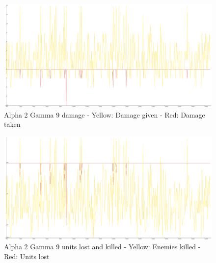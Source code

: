 \begin{figure}
\includegraphics[angle=-90, scale=0.25]{Figures/learningrate/A2G9/damage.png}
\caption{Alpha 2 Gamma 9 damage - Yellow: Damage given - Red: Damage taken}
\label{fig:a2g9_damage}
\end{figure}	

\begin{figure}
\includegraphics[angle=-90, scale=0.25]{Figures/learningrate/A2G9/units_lost_and_units_killed.png}
\caption{Alpha 2 Gamma 9 units lost and killed - Yellow: Enemies killed - Red: Units lost}
\label{fig:a2g9_units lost and killed}
\end{figure}	

\newpage

